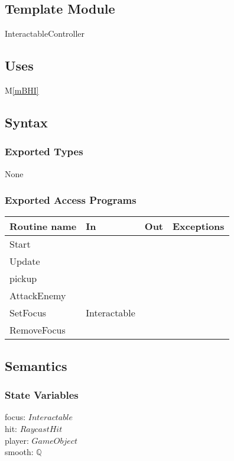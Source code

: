 \documentclass[12pt]{article}
\newcommand{\mref}[1]{M\ref{#1}}
\begin{document}
\subsection*{Template Module}

InteractableController

\subsection* {Uses}

\mref{mBHI}

\subsection* {Syntax}

\subsubsection* {Exported Types}

None

\subsubsection* {Exported Access Programs}

\begin{tabular}{| l | l | l | l |}
\hline
\textbf{Routine name} & \textbf{In} & \textbf{Out} & \textbf{Exceptions}\\
\hline
Start & ~ & ~  & ~\\
Update & ~ & ~ & ~\\
pickup & ~ & ~ & ~\\
AttackEnemy & ~ & ~ & ~\\
SetFocus & Interactable & ~ & ~\\
RemoveFocus & ~ & ~ & ~\\
\hline
\end{tabular}

\subsection* {Semantics}

\subsubsection* {State Variables}

focus: $Interactable$\\
hit: $RaycastHit$\\
player: $GameObject$\\
smooth: $\mathbb{Q}$
\end{document}
